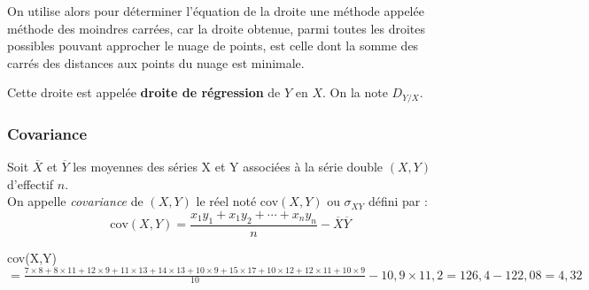  On utilise alors pour déterminer l'équation de la droite  une méthode appelée méthode des moindres carrées, car la droite obtenue, parmi toutes les droites possibles pouvant approcher le nuage de points, est celle dont la somme des carrés des distances aux points du nuage est minimale.

 Cette droite est appelée  \textbf{droite de régression}
 de $Y$ en $X$. On la note $D_{Y/X }$.
 
 
 \begin{center}
\end{center}
 \subsubsection*{Covariance}
\begin{definition}

Soit $ \overline{X} $ et $ \overline{Y} $ les moyennes des séries
 X et Y associées à la série double $(X,Y)$
d'effectif $n$. \\On appelle \textit{covariance } de $(X,Y)$ le
réel noté cov$(X,Y)$ ou   $ \sigma _{XY} $ défini par : 
\[\text{cov}(X,Y)=\dfrac{x_{1}y_{1}+x_{1}y_{2}+\cdots+x_{n}y_{n}}{ n}  -\overline{X}\overline{Y}\]
\end{definition}
\begin{example}

 cov(X,Y)$= \frac{  7 \times8+ 8\times11+  12 \times9+  11\times13 +  14 \times13 +10 \times9+ 15\times17 + 10\times 12+12\times11 + 10\times9}{10} - 10,9 \times 11,2=126,4-122,08=4,32$

\end{example}

